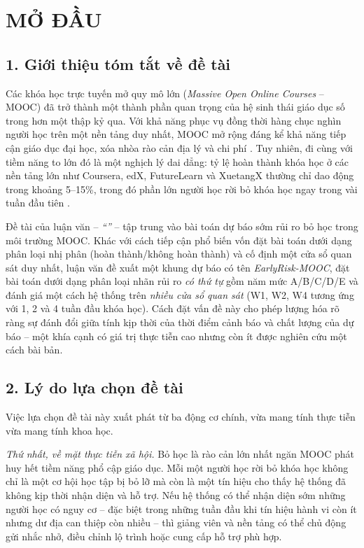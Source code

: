 \chapter{MỞ ĐẦU}
\label{ch:modau}

\section*{1. Giới thiệu tóm tắt về đề tài}

Các khóa học trực tuyến mở quy mô lớn (\textit{Massive Open Online Courses} -- MOOC) đã trở thành một thành phần quan trọng của hệ sinh thái giáo dục số trong hơn một thập kỷ qua. Với khả năng phục vụ đồng thời hàng chục nghìn người học trên một nền tảng duy nhất, MOOC mở rộng đáng kể khả năng tiếp cận giáo dục đại học, xóa nhòa rào cản địa lý và chi phí \cite{deFreitas2015}. Tuy nhiên, đi cùng với tiềm năng to lớn đó là một nghịch lý dai dẳng: tỷ lệ hoàn thành khóa học ở các nền tảng lớn như Coursera, edX, FutureLearn và XuetangX thường chỉ dao động trong khoảng 5--15\%, trong đó phần lớn người học rời bỏ khóa học ngay trong vài tuần đầu tiên \cite{Deng2022}.

Đề tài của luận văn -- \textit{``\thesistitleshort''} -- tập trung vào bài toán dự báo sớm rủi ro bỏ học trong môi trường MOOC. Khác với cách tiếp cận phổ biến vốn đặt bài toán dưới dạng phân loại nhị phân (hoàn thành/không hoàn thành) và cố định một cửa sổ quan sát duy nhất, luận văn đề xuất một khung dự báo có tên \textit{EarlyRisk-MOOC}, đặt bài toán dưới dạng phân loại nhãn rủi ro \emph{có thứ tự} gồm năm mức A/B/C/D/E và đánh giá một cách hệ thống trên \emph{nhiều cửa sổ quan sát} (W1, W2, W4 tương ứng với 1, 2 và 4 tuần đầu khóa học). Cách đặt vấn đề này cho phép lượng hóa rõ ràng sự đánh đổi giữa tính kịp thời của thời điểm cảnh báo và chất lượng của dự báo -- một khía cạnh có giá trị thực tiễn cao nhưng còn ít được nghiên cứu một cách bài bản.

\section*{2. Lý do lựa chọn đề tài}

Việc lựa chọn đề tài này xuất phát từ ba động cơ chính, vừa mang tính thực tiễn vừa mang tính khoa học.

\textit{Thứ nhất, về mặt thực tiễn xã hội.} Bỏ học là rào cản lớn nhất ngăn MOOC phát huy hết tiềm năng phổ cập giáo dục. Mỗi một người học rời bỏ khóa học không chỉ là một cơ hội học tập bị bỏ lỡ mà còn là một tín hiệu cho thấy hệ thống đã không kịp thời nhận diện và hỗ trợ. Nếu hệ thống có thể nhận diện sớm những người học có nguy cơ -- đặc biệt trong những tuần đầu khi tín hiệu hành vi còn ít nhưng dư địa can thiệp còn nhiều -- thì giảng viên và nền tảng có thể chủ động gửi nhắc nhở, điều chỉnh lộ trình hoặc cung cấp hỗ trợ phù hợp.

